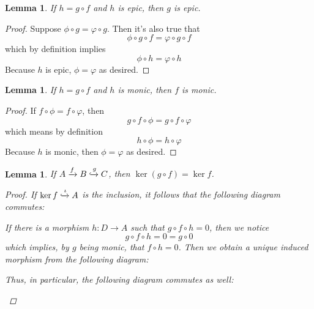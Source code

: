 \documentclass{article}
\newtheorem{lemma}[theorem]{Lemma}
\begin{document}
\begin{lemma}\label{lem:comp epic then epic}
    If $h=g\circ f$ and $h$ is epic, then $g$ is epic.
\end{lemma}
\begin{proof}
    Suppose $\phi\circ g=\varphi \circ g$. Then it's also true that
    \[
    \phi \circ g\circ f=\varphi\circ g\circ f
    \]
    which by definition implies
    \[
    \phi \circ h=\varphi\circ h
    \]
    Because $h$ is epic, $\phi=\varphi$ as desired.
\end{proof}
\begin{lemma}\label{lem:comp monic then monic}
    If $h=g\circ f$ and $h$ is monic, then $f$ is monic.
\end{lemma}
\begin{proof}
    If $f\circ \phi=f\circ \varphi$, then
    \[
    g\circ f\circ \phi=g\circ f\circ \varphi
    \]
    which means by definition
    \[
    h\circ \phi=h\circ \varphi
    \]
    Because $h$ is monic, then $\phi=\varphi$ as desired.
\end{proof}
\begin{lemma}\label{lem:comp with monic and ker}
    If $A\xrightarrow{f} B\xhookrightarrow{g}C$, then $\ker (g\circ f)=\ker f$.
    \begin{proof}
        If $\ker f\xhookrightarrow{\iota} A$ is the inclusion, it follows that the following diagram commutes:
        \begin{center}
        \end{center}
        If there is a morphism $h:D\to A$ such that $g\circ f \circ h=0$, then we notice
        \[
        g\circ f\circ h=0=g\circ 0
        \]
        which implies, by $g$ being monic, that $f\circ h=0$. Then we obtain a unique induced morphism from the following diagram:
        \begin{center}
        \end{center}
        Thus, in particular, the following diagram commutes as well:
        \begin{center}
        \end{center}
    \end{proof}
\end{lemma}
\end{document}

